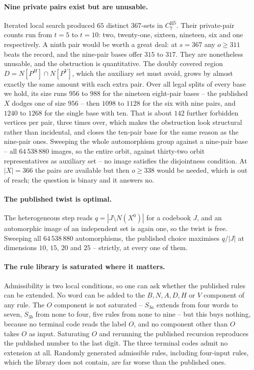 \documentclass[11pt]{article}
\theoremstyle{definition}
\begin{document}
\paragraph{Nine private pairs exist but are unusable.}
Iterated local search produced $65$ distinct $367$-sets in $C_7^{\boxtimes 5}$. Their private-pair
counts run from $t = 5$ to $t = 10$: two, twenty-one, sixteen, nineteen, six and one respectively.
A ninth pair would be worth a great deal: at $s = 367$ any $o \ge 311$ beats the record, and the
nine-pair bases offer $315$ to $317$. They are nonetheless unusable, and the obstruction is
quantitative. The doubly covered region $D = N[P^H] \cap N[P^V]$, which the auxiliary set must
avoid, grows by almost exactly the same amount with each extra pair. Over all legal splits of
every base we hold, its size runs $956$ to $988$ for the nineteen eight-pair bases -- the
published $X$ dodges one of size $956$ -- then $1098$ to $1128$ for the six with nine pairs, and
$1240$ to $1268$ for the single base with ten. That is about $142$ further forbidden vertices per
pair, three times over, which makes the obstruction look structural rather than incidental, and
closes the ten-pair base for the same reason as the nine-pair ones. Sweeping the whole
automorphism group against a nine-pair base -- all $64\,538\,880$ images, so the entire orbit,
against thirty-two orbit representatives as auxiliary set -- no image satisfies the disjointness
condition. At $|X| = 366$ the pairs are
available but then $o \ge 338$ would be needed, which is out of reach; the question is binary and
it answers no.

\paragraph{The published twist is optimal.}
The heterogeneous step reads $q = |J \setminus N(X^0)|$ for a codebook $J$, and an automorphic
image of an independent set is again one, so the twist is free. Sweeping all $64\,538\,880$
automorphisms, the published choice maximises $q/|J|$ at dimensions $10$, $15$, $20$ and $25$ --
strictly, at every one of them.

\paragraph{The rule library is saturated where it matters.}
Admissibility is two local conditions, so one can ask whether the published rules can be extended.
No word can be added to the $B, N, A, D, H$ or $V$ component of any rule. The $O$ component is not
saturated -- $S_{3a}$ extends from four words to seven, $S_{3b}$ from none to four, five rules
from none to nine -- but this buys nothing, because no terminal code reads the label $O$, and no
component other than $O$ takes $O$ as input. Saturating $O$ and rerunning the published recursion
reproduces the published number to the last digit. The three terminal codes admit no extension at
all. Randomly generated admissible rules, including four-input rules, which the library does not
contain, are far worse than the published ones.
\end{document}
